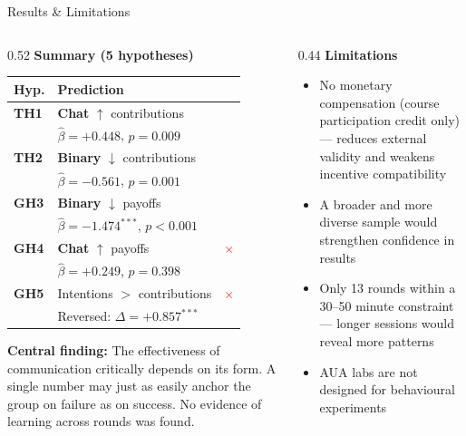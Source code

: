 \documentclass[aspectratio=169,10pt]{beamer}
\newcommand{\bo}[1]{\textcolor{binaryorange}{\textbf{#1}}}
\newcommand{\cb}[1]{\textcolor{chatblue}{\textbf{#1}}}
\newcommand{\yes}{\textcolor{controlgreen}{\checkmark}}
\newcommand{\no}{\textcolor{red}{$\times$}}
\begin{document}
\begin{frame}{Results \& Limitations}

\begin{columns}[T]
  \begin{column}{0.52\textwidth}
    \small\textbf{Summary (5 hypotheses)}\\[0.3em]
    \footnotesize
    \setlength{\tabcolsep}{3pt}
    \renewcommand{\arraystretch}{1.30}
    \begin{tabular}{@{}p{0.7cm}p{4.0cm}c@{}}
      \toprule
      \textbf{Hyp.} & \textbf{Prediction} & \\
      \midrule
      \textbf{TH1} & \cb{Chat} $\uparrow$ contributions & \yes \\
                   & \tiny $\hat\beta{=}+0.448$,\; $p{=}0.009$ & \\[2pt]
      \textbf{TH2} & \bo{Binary} $\downarrow$ contributions & \yes \\
                   & \tiny $\hat\beta{=}-0.561$,\; $p{=}0.001$ & \\[2pt]
      \textbf{GH3} & \bo{Binary} $\downarrow$ payoffs & \yes \\
                   & \tiny $\hat\beta{=}-1.474^{***}$,\; $p{<}0.001$ & \\[2pt]
      \textbf{GH4} & \cb{Chat} $\uparrow$ payoffs & \no \\
                   & \tiny $\hat\beta{=}+0.249$,\; $p{=}0.398$ & \\[2pt]
      \textbf{GH5} & Intentions $>$ contributions & \no \\
                   & \tiny Reversed: $\Delta{=}+0.857^{***}$ & \\
      \bottomrule
    \end{tabular}

    \vspace{0.35em}
    \small
    \textbf{Central finding:} The effectiveness of communication critically depends on its form.
    A single number may just as easily anchor the group on failure as on success.
    No evidence of learning across rounds was found.
  \end{column}

  \begin{column}{0.44\textwidth}
    \small\textbf{Limitations}
    \begin{itemize}\footnotesize
      \item No monetary compensation (course participation credit only) --- reduces external validity and weakens incentive compatibility
      \item A broader and more diverse sample would strengthen confidence in results
      \item Only 13 rounds within a 30--50 minute constraint --- longer sessions would reveal more patterns
      \item AUA labs are not designed for behavioural experiments
    \end{itemize}


\end{column}
\end{columns}
\end{frame}
\end{document}
